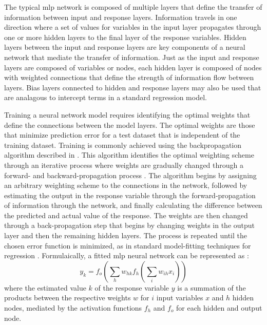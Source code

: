 \documentclass[article,shortnames]{jss}
\begin{document}
The typical \ac{mlp} network is composed of multiple layers that define the transfer of information between input and response layers.  Information travels in one direction where a set of values for variables in the input layer propagates through one or more hidden layers to the final layer of the response variables. Hidden layers between the input and response layers are key components of a neural network that mediate the transfer of information.  Just as the input and response layers are composed of variables or nodes, each hidden layer is composed of nodes with weighted connections that define the strength of information flow between layers.  Bias layers connected to hidden and response layers may also be used that are analagous to intercept terms in a standard regression model.

Training a neural network model requires identifying the optimal weights that define the connections between the model layers.  The optimal weights are those that minimize prediction error for a test dataset that is independent of the training dataset.  Training is commonly achieved using the backpropagation algorithm described in \citep{Rumelhart86}.  This algorithm identifies the optimal weighting scheme through an iterative process where weights are gradually changed through a forward- and backward-propagation process \citep{Rumelhart86,Lek00}.  The algorithm begins by assigning an arbitrary weighting scheme to the connections in the network, followed by estimating the output in the response variable through the forward-propagation of information through the network, and finally calculating the difference between the predicted and actual value of the response.  The weights are then changed through a back-propagation step that begins by changing weights in the output layer and then the remaining hidden layers.  The process is repeated until the chosen error function is minimized, as in standard model-fitting techniques for regression \citep{Cheng94}.  Formulaically, a fitted \ac{mlp} neural network can be represented as \citep{Bishop95,Venables02}:
\begin{equation}
y_k = f_o \left(\sum\limits_{h} w_{hk}f_h \left( \sum\limits_{i} w_{ih}x_i\right) \right)
\end{equation}
where the estimated value $k$ of the response variable $y$ is a summation of the products between the respective weights $w$ for $i$ input variables $x$ and $h$ hidden nodes, mediated by the activation functions $f_h$ and $f_o$ for each hidden and output node.
\end{document}
